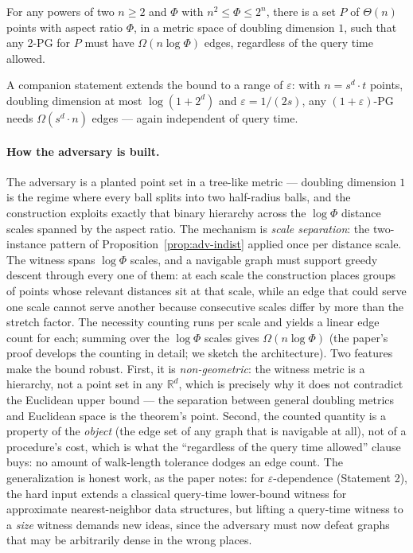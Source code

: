 \begin{theorem}\label{thm:adv-proxlb}
For any powers of two $n \ge 2$ and $\Phi$ with $n^2 \le \Phi \le 2^n$, there is a set $P$ of
$\Theta(n)$ points with aspect ratio $\Phi$, in a metric space of doubling dimension $1$, such
that any 2-PG for $P$ must have $\Omega(n\log\Phi)$ edges, regardless of the query time
allowed. \eop
\end{theorem}

A companion statement extends the bound to a range of $\varepsilon$: with $n = s^d\cdot t$
points, doubling dimension at most $\log(1+2^d)$ and $\varepsilon = 1/(2s)$, any
$(1+\varepsilon)$-PG needs $\Omega(s^d\cdot n)$ edges --- again independent of query time.

\paragraph{How the adversary is built.}
The adversary is a planted point set in a tree-like metric --- doubling dimension $1$ is the
regime where every ball splits into two half-radius balls, and the construction exploits
exactly that binary hierarchy across the $\log\Phi$ distance scales spanned by the aspect
ratio. The mechanism is \emph{scale separation}: the two-instance pattern of
Proposition~\ref{prop:adv-indist} applied once per distance scale. The witness spans
$\log\Phi$ scales, and a navigable graph must support greedy descent through every one of
them: at each scale the construction places groups of points whose relevant distances sit at
that scale, while an edge that could serve one scale cannot serve another because consecutive
scales differ by more than the stretch factor. The necessity counting runs per scale and
yields a linear edge count for each; summing over the $\log\Phi$ scales gives
$\Omega(n\log\Phi)$ (the paper's proof develops the counting in detail; we sketch the
architecture). Two features make the bound robust. First, it is
\emph{non-geometric}: the witness metric is a hierarchy, not a point set in any
$\mathbb{R}^d$, which is precisely why it does not contradict the Euclidean upper bound ---
the separation between general doubling metrics and Euclidean space is the theorem's point.
Second, the counted quantity is a property of the \emph{object} (the edge set of any graph
that is navigable at all), not of a procedure's cost, which is what the ``regardless of the
query time allowed'' clause buys: no amount of walk-length tolerance dodges an edge count. The
generalization is honest work, as the paper notes: for $\varepsilon$-dependence
(Statement 2), the hard input extends a classical query-time lower-bound witness for
approximate nearest-neighbor data structures, but lifting a query-time witness to a
\emph{size} witness demands new ideas, since the adversary must now defeat graphs that may be
arbitrarily dense in the wrong places.

